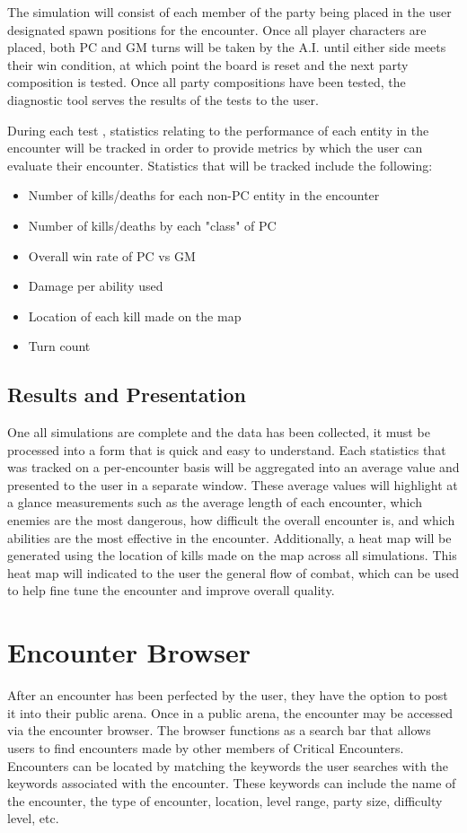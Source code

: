 \documentclass[12pt,a4paper]{report}
\begin{document}
		The simulation will consist of each member of the party being placed in the user designated spawn positions for the encounter. Once all player characters are placed, both PC and GM turns will be taken by the A.I. until either side meets their win condition, at which point the board is reset and the next party composition is tested. Once all party compositions have been tested, the diagnostic tool serves the results of the tests to the user.
		
		 During each test , statistics relating to the performance of each entity in the encounter will be tracked in order to provide metrics by which the user can evaluate their encounter. Statistics that will be tracked include the following:
		 
		\begin{itemize}
			\item Number of kills/deaths for each non-PC entity in the encounter
			\item Number of kills/deaths by each "class" of PC
			\item Overall win rate of PC vs GM
			\item Damage per ability used
			\item Location of each kill made on the map
			\item Turn count
		\end{itemize}
	
	
		\subsection{Results and Presentation}
		One all simulations are complete and the data has been collected, it must be processed into a form that is quick and easy to understand. Each statistics that was tracked on a per-encounter basis will be aggregated into an average value and presented to the user in a separate window. These average values will highlight at a glance measurements such as the average length of each encounter, which enemies are the most dangerous, how difficult the overall encounter is, and which abilities are the most effective in the encounter. Additionally, a heat map will be generated using the location of kills made on the map across all simulations. This heat map will indicated to the user the general flow of combat, which can be used to help fine tune the encounter and improve overall quality. 
		
	\section{Encounter Browser}
	After an encounter has been perfected by the user, they have the option to post it into their public arena. Once in a public arena, the encounter may be accessed via the encounter browser. The browser functions as a search bar that allows users to find encounters made by other members of Critical Encounters. Encounters can be located by matching the keywords the user searches with the keywords associated with the encounter. These keywords can include the name of the encounter, the type of encounter, location, level range, party size, difficulty level, etc.
	
\end{document}
